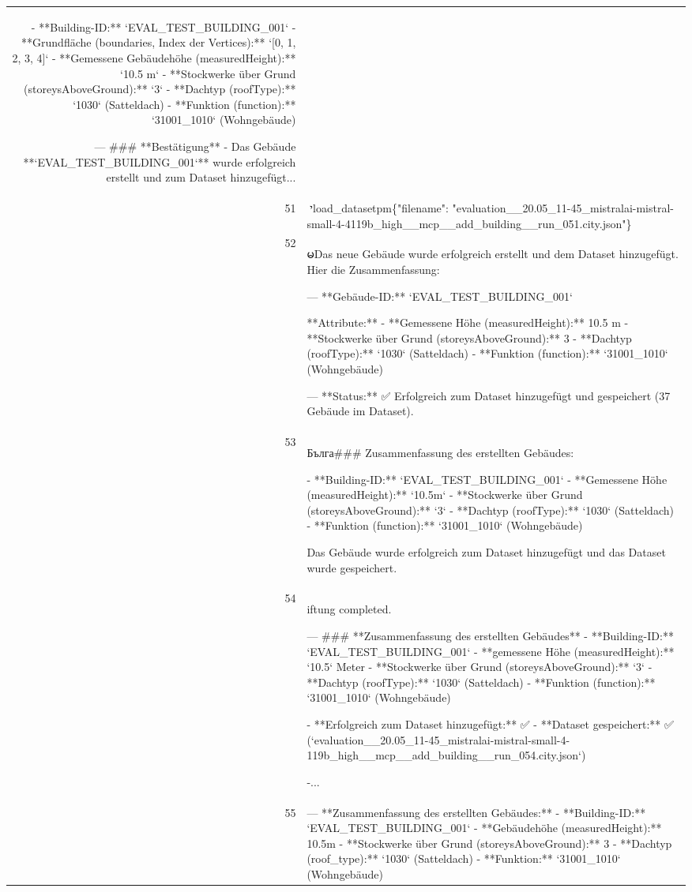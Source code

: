 \documentclass[a4paper,11pt]{article}
\begin{document}
\begin{table}[ht]
\begin{tabular}{r p{12cm}}
- **Building-ID:** `EVAL\_TEST\_BUILDING\_001`
- **Grundfläche (boundaries, Index der Vertices):** `[0, 1, 2, 3, 4]`
- **Gemessene Gebäudehöhe (measuredHeight):** `10.5 m`
- **Stockwerke über Grund (storeysAboveGround):** `3`
- **Dachtyp (roofType):** `1030` (Satteldach)
- **Funktion (function):** `31001\_1010` (Wohngebäude)

---
\#\#\# **Bestätigung**
- Das Gebäude **`EVAL\_TEST\_BUILDING\_001`** wurde erfolgreich erstellt und zum Dataset hinzugefügt... \\
51 & י׏load\_datasetpm\{"filename": "evaluation\_\_20.05\_11-45\_mistralai-mistral-small-4-4119b\_high\_\_mcp\_\_add\_building\_\_run\_051.city.json"\} \\
52 &  မDas neue Gebäude wurde erfolgreich erstellt und dem Dataset hinzugefügt. Hier die Zusammenfassung:

---
**Gebäude-ID:** `EVAL\_TEST\_BUILDING\_001`

**Attribute:**
- **Gemessene Höhe (measuredHeight):** 10.5 m
- **Stockwerke über Grund (storeysAboveGround):** 3
- **Dachtyp (roofType):** `1030` (Satteldach)
- **Funktion (function):** `31001\_1010` (Wohngebäude)

---
**Status:** ✅ Erfolgreich zum Dataset hinzugefügt und gespeichert (37 Gebäude im Dataset). \\
53 &  Бълга\#\#\# Zusammenfassung des erstellten Gebäudes:

- **Building-ID:** `EVAL\_TEST\_BUILDING\_001`
- **Gemessene Höhe (measuredHeight):** `10.5m`
- **Stockwerke über Grund (storeysAboveGround):** `3`
- **Dachtyp (roofType):** `1030` (Satteldach)
- **Funktion (function):** `31001\_1010` (Wohngebäude)

Das Gebäude wurde erfolgreich zum Dataset hinzugefügt und das Dataset wurde gespeichert. \\
54 & iftung completed.

---
\#\#\# **Zusammenfassung des erstellten Gebäudes**
- **Building-ID:** `EVAL\_TEST\_BUILDING\_001`
- **gemessene Höhe (measuredHeight):** `10.5` Meter
- **Stockwerke über Grund (storeysAboveGround):** `3`
- **Dachtyp (roofType):** `1030` (Satteldach)
- **Funktion (function):** `31001\_1010` (Wohngebäude)

- **Erfolgreich zum Dataset hinzugefügt:** ✅
- **Dataset gespeichert:** ✅ (`evaluation\_\_20.05\_11-45\_mistralai-mistral-small-4-119b\_high\_\_mcp\_\_add\_building\_\_run\_054.city.json`)

-... \\
55 & ---
**Zusammenfassung des erstellten Gebäudes:**
- **Building-ID:** `EVAL\_TEST\_BUILDING\_001`
- **Gebäudehöhe (measuredHeight):** 10.5m
- **Stockwerke über Grund (storeysAboveGround):** 3
- **Dachtyp (roof\_type):** `1030` (Satteldach)
- **Funktion:** `31001\_1010` (Wohngebäude)


\end{tabular}
\end{table}
\end{document}
